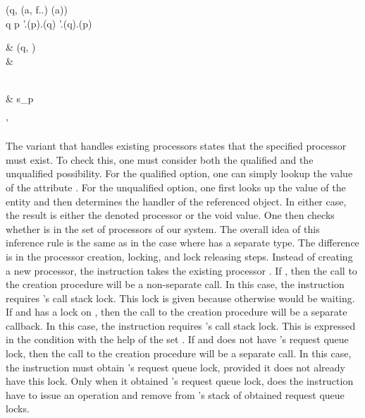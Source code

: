 \begin{forjournal}
{{					{\nooperation}
					{\issueoperation(q, \evaluateoperation(a, f.\classtypefeature.\invariantfeature) \statementseparator \waitoperation(a))} \statementseparator \\
				\multilineconditionaloperation
					{q \neq p \wedge \neg \state'.\requestqueuelocksfeature(p).\containsfeature(q) \wedge \neg \state'.\requestqueuelocksfeature(q).\containsfeature(p)}
					{
						\begin{split}
							& \issueoperation(q, \unlockrequestqueueoperation) \statementseparator \\
							& \popobtainedrequestqueuelocksoperation 
						\end{split}
					}
					{\nooperation} \statementseparator \\
				& s_{p}
			}
			{\state'}
	}
 \end{forjournal}

The variant that handles existing processors states that the specified processor must exist. To check this, one must consider both the qualified and the unqualified possibility. For the qualified option, one can simply lookup the value of the attribute . For the unqualified option, one first looks up the value of the entity  and then determines the handler of the referenced object. In either case, the result  is either the denoted processor or the void value. One then checks whether  is in the set of processors of our system. The overall idea of this inference rule is the same as in the case where  has a separate type. The difference is in the processor creation, locking, and lock releasing steps. Instead of creating a new processor, the instruction takes the existing processor . If , then the call to the creation procedure will be a non-separate call. In this case, the instruction requires 's call stack lock. This lock is given because otherwise  would be waiting. If  and  has a lock on , then the call to the creation procedure will be a separate callback. In this case, the instruction requires 's call stack lock. This is expressed in the condition with the help of the set . If  and  does not have 's request queue lock, then the call to the creation procedure will be a separate call. In this case, the instruction must obtain 's request queue lock, provided it does not already have this lock. Only when it obtained 's request queue lock, does the instruction have to issue an  operation and remove  from 's stack of obtained request queue locks.

